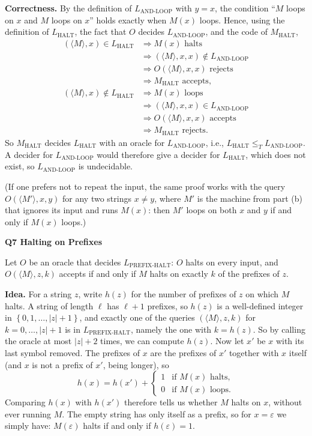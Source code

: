 \documentclass[11pt]{article}
\newcommand{\set}[1]{\left\{#1\right\}}
\newcommand{\abs}[1]{\left|#1\right|}
\newcommand{\inner}[1]{\langle #1 \rangle}
\newcommand{\lT}{\leq_T}
\newcommand{\Lh}{L_{\text{HALT}}}
\newcommand{\Lal}{L_{\text{AND-LOOP}}}
\newcommand{\Lph}{L_{\text{PREFIX-HALT}}}
\newcommand{\qpage}[1]{\clearpage\noindent\textbf{\large #1}\par\medskip}
\begin{document}
\textbf{Correctness.}
By the definition of $\Lal$ with $y = x$, the condition ``$M$ loops on $x$ and $M$ loops on $x$'' holds exactly when $M(x)$ loops.
Hence, using the definition of $\Lh$, the fact that $O$ decides $\Lal$, and the code of $M_{\text{HALT}}$,
\begin{align*}
  (\inner{M}, x) \in \Lh &\Longrightarrow M(x) \text{ halts} \\
  &\Longrightarrow (\inner{M}, x, x) \notin \Lal \\
  &\Longrightarrow O(\inner{M}, x, x) \text{ rejects} \\
  &\Longrightarrow M_{\text{HALT}} \text{ accepts}, \\[0.5em]
  (\inner{M}, x) \notin \Lh &\Longrightarrow M(x) \text{ loops} \\
  &\Longrightarrow (\inner{M}, x, x) \in \Lal \\
  &\Longrightarrow O(\inner{M}, x, x) \text{ accepts} \\
  &\Longrightarrow M_{\text{HALT}} \text{ rejects}.
\end{align*}
So $M_{\text{HALT}}$ decides $\Lh$ with an oracle for $\Lal$, i.e., $\Lh \lT \Lal$.
A decider for $\Lal$ would therefore give a decider for $\Lh$, which does not exist, so $\Lal$ is undecidable.

(If one prefers not to repeat the input, the same proof works with the query $O(\inner{M'}, x, y)$ for any two strings $x \ne y$, where $M'$ is the machine from part (b) that ignores its input and runs $M(x)$: then $M'$ loops on both $x$ and $y$ if and only if $M(x)$ loops.)

\qpage{Q7 Halting on Prefixes}

Let $O$ be an oracle that decides $\Lph$: $O$ halts on every input, and $O(\inner{M}, z, k)$ accepts if and only if $M$ halts on exactly $k$ of the prefixes of $z$.

\textbf{Idea.}
For a string $z$, write $h(z)$ for the number of prefixes of $z$ on which $M$ halts.
A string of length $\ell$ has $\ell + 1$ prefixes, so $h(z)$ is a well-defined integer in $\set{0, 1, \ldots, \abs{z}+1}$, and exactly one of the queries $(\inner{M}, z, k)$ for $k = 0, \ldots, \abs{z}+1$ is in $\Lph$, namely the one with $k = h(z)$.
So by calling the oracle at most $\abs{z} + 2$ times, we can compute $h(z)$.
Now let $x'$ be $x$ with its last symbol removed.
The prefixes of $x$ are the prefixes of $x'$ together with $x$ itself (and $x$ is not a prefix of $x'$, being longer), so
\[
  h(x) = h(x') + \begin{cases} 1 & \text{if } M(x) \text{ halts}, \\ 0 & \text{if } M(x) \text{ loops}. \end{cases}
\]
Comparing $h(x)$ with $h(x')$ therefore tells us whether $M$ halts on $x$, without ever running $M$.
The empty string has only itself as a prefix, so for $x = \varepsilon$ we simply have: $M(\varepsilon)$ halts if and only if $h(\varepsilon) = 1$.
\end{document}
